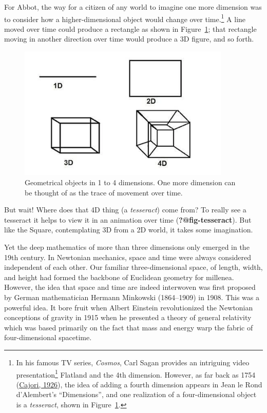 \documentclass[
  letterpaper,
  10pt,
  krantz2]{krantz}
\providecommand{\href}[2]{#2\footnote{\url{#1}}}
\begin{document}
For Abbot, the way for a citizen of any world to imagine one more
dimension was to consider how a higher-dimensional object would change
over time.\footnote{In his famous TV series, \emph{Cosmos}, Carl Sagan
  provides \href{https://youtu.be/UnURElCzGc0}{an intriguing video
  presentation} Flatland and the 4th dimension. However, as far back as
  1754 (\protect\hyperlink{ref-Cajori:1926}{Cajori, 1926}), the idea of
  adding a fourth dimension appears in Jean le Rond d'Alembert's
  ``Dimensions'', and one realization of a four-dimensional object is a
  \emph{tesseract}, shown in Figure~\ref{fig-1D-4D}.} A line moved over
time could produce a rectangle as shown in Figure~\ref{fig-1D-4D}; that
rectangle moving in another direction over time would produce a 3D
figure, and so forth.

\begin{figure}

{\centering \includegraphics[width=0.9\textwidth,height=\textheight]{images/1D-4D.png}

}

\caption{\label{fig-1D-4D}Geometrical objects in 1 to 4 dimensions. One
more dimension can be thought of as the trace of movement over time.}

\end{figure}

But wait! Where does that 4D thing (a \emph{tesseract}) come from? To
really see a tesseract it helps to view it in an animation over time
(\textbf{?@fig-tesseract}). But like the Square, contemplating 3D from a
2D world, it takes some imagination.

Yet the deep mathematics of more than three dimensions only emerged in
the 19th century. In Newtonian mechanics, space and time were always
considered independent of each other. Our familiar three-dimensional
space, of length, width, and height had formed the backbone of Euclidean
geometry for millenea. However, the idea that space and time are indeed
interwoven was first proposed by German mathematician Hermann Minkowski
(1864--1909) in 1908. This was a powerful idea. It bore fruit when
Albert Einstein revolutionized the Newtonian conceptions of gravity in
1915 when he presented a theory of general relativity which was based
primarily on the fact that mass and energy warp the fabric of
four-dimensional spacetime.
\end{document}
